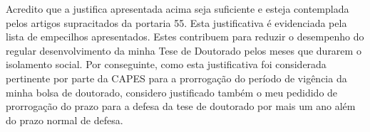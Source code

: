 Acredito que a justifica apresentada acima seja suficiente e esteja contemplada pelos artigos supracitados da portaria 55. Esta justificativa é evidenciada pela lista de empecilhos apresentados. Estes contribuem para reduzir o desempenho do regular desenvolvimento da minha Tese de Doutorado pelos meses que durarem o isolamento social. Por conseguinte, como esta
justificativa foi considerada pertinente por parte da CAPES para a prorrogação do período de vigência da minha bolsa
de doutorado, considero justificado também o meu pedidido de prorrogação do prazo para a defesa da tese de doutorado por mais
um ano além do prazo normal de defesa.

